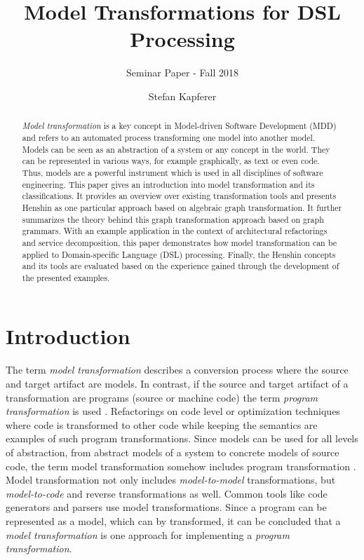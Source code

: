 \documentclass[runningheads]{llncs}
\begin{document}
\title{Model Transformations for DSL Processing}
\subtitle{Seminar Paper - Fall 2018}
\author{Stefan Kapferer}
%
\maketitle
%
\begin{abstract}
\textit{Model transformation} is a key concept in Model-driven Software Development (MDD) and refers to an automated process transforming one model into another model. Models can be seen as an abstraction of a system or any concept in the world. They can be represented in various ways, for example graphically, as text or even code. Thus, models are a powerful instrument which is used in all disciplines of software engineering. This paper gives an introduction into model transformation and its classifications. It provides an overview over existing transformation tools and presents Henshin \cite{Arendt:2010:HAC:1926458.1926471} as one particular approach based on algebraic graph transformation. It further summarizes the theory behind this graph transformation approach based on graph grammars. With an example application in the context of architectural refactorings and service decomposition, this paper demonstrates how model transformation can be applied to Domain-specific Language (DSL) processing. Finally, the Henshin concepts and its tools are evaluated based on the experience gained through the development of the presented examples.

\end{abstract}
%
%
%
\section{Introduction}
The term \textit{model transformation} describes a conversion process where the source and target artifact are models. In contrast, if the source and target artifact of a transformation are programs (source or machine code) the term \textit{program transformation} is used \cite{MENS2006125}. Refactorings on code level or optimization techniques where code is transformed to other code while keeping the semantics are examples of such program transformations. Since models can be used for all levels of abstraction, from abstract models of a system to concrete models of source code, the term model transformation somehow includes program transformation \cite{MENS2006125}. Model transformation not only includes \textit{model-to-model} transformations, but \textit{model-to-code} and reverse transformations as well. Common tools like code generators and parsers use model transformations. Since a program can be represented as a model, which can by transformed, it can be concluded that a \textit{model transformation} is one approach for implementing a \textit{program transformation}.
\end{document}
